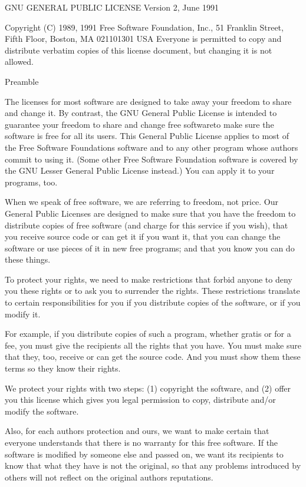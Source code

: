\documentclass[letterpaper,10pt,english]{sphinxmanual}
\begin{document}
\begin{sphinxVerbatim}[commandchars=\\\{\}]
                    GNU GENERAL PUBLIC LICENSE
                       Version 2, June 1991

 Copyright (C) 1989, 1991 Free Software Foundation, Inc.,
 51 Franklin Street, Fifth Floor, Boston, MA 02110\PYGZhy{}1301 USA
 Everyone is permitted to copy and distribute verbatim copies
 of this license document, but changing it is not allowed.

                            Preamble

  The licenses for most software are designed to take away your
freedom to share and change it.  By contrast, the GNU General Public
License is intended to guarantee your freedom to share and change free
software\PYGZhy{}\PYGZhy{}to make sure the software is free for all its users.  This
General Public License applies to most of the Free Software
Foundation\PYGZsq{}s software and to any other program whose authors commit to
using it.  (Some other Free Software Foundation software is covered by
the GNU Lesser General Public License instead.)  You can apply it to
your programs, too.

  When we speak of free software, we are referring to freedom, not
price.  Our General Public Licenses are designed to make sure that you
have the freedom to distribute copies of free software (and charge for
this service if you wish), that you receive source code or can get it
if you want it, that you can change the software or use pieces of it
in new free programs; and that you know you can do these things.

  To protect your rights, we need to make restrictions that forbid
anyone to deny you these rights or to ask you to surrender the rights.
These restrictions translate to certain responsibilities for you if you
distribute copies of the software, or if you modify it.

  For example, if you distribute copies of such a program, whether
gratis or for a fee, you must give the recipients all the rights that
you have.  You must make sure that they, too, receive or can get the
source code.  And you must show them these terms so they know their
rights.

  We protect your rights with two steps: (1) copyright the software, and
(2) offer you this license which gives you legal permission to copy,
distribute and/or modify the software.

  Also, for each author\PYGZsq{}s protection and ours, we want to make certain
that everyone understands that there is no warranty for this free
software.  If the software is modified by someone else and passed on, we
want its recipients to know that what they have is not the original, so
that any problems introduced by others will not reflect on the original
authors\PYGZsq{} reputations.


\end{sphinxVerbatim}
\end{document}
